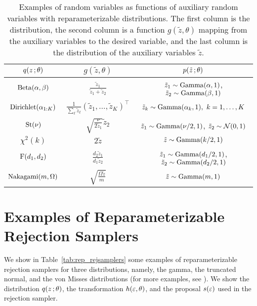 \begin{table*}[t]
\centering
\begin{tabular}{ccc}
\toprule
$q(z\, ;\theta)$ & $g(\tilde z, \theta)$ &  $p(\tilde z\, ;\theta)$\\
\hline
$\operatorname*{Beta}(\alpha,\beta)$ & $\displaystyle\frac{\tilde z_1}{\tilde z_1 + \tilde z_2}$ & $\tilde z_1 \sim \operatorname*{Gamma}(\alpha,1)$, $\tilde z_2  \sim \operatorname*{Gamma}(\beta,1)$\\%
$\operatorname*{Dirichlet}(\alpha_{1:K})$ &$\displaystyle\frac{1}{\sum_\ell \tilde z_\ell} \left(\tilde z_1,\ldots,\tilde z_K\right)^\top$ & $\tilde z_k \sim \operatorname*{Gamma}(\alpha_k,1), ~k=1,\ldots,K$\\
$\operatorname*{St}(\nu)$ & $\displaystyle\sqrt{\frac{\nu}{2 \tilde z_1}} \tilde z_2$ & $\tilde z_1 \sim \operatorname*{Gamma}(\nu/2,1)$, $\tilde z_2 \sim \mathcal{N}(0,1)$\\
$\chi^2(k)$ & $\displaystyle2\tilde z$& $\tilde z \sim \operatorname*{Gamma}(k/2,1)$\\
$\operatorname*{F}(d_1,d_2)$ & $\displaystyle\frac{d_2 \tilde z_1}{d_1 \tilde z_2}$ & $\tilde z_1 \sim \operatorname*{Gamma}(d_1/2,1)$, $\tilde z_2  \sim \operatorname*{Gamma}(d_2/2,1)$\\
$\operatorname*{Nakagami}(m,\Omega)$ & $\displaystyle \sqrt{\frac{\Omega\tilde z}{m}}$ & $\tilde z \sim \operatorname*{Gamma}(m,1)$ \\ \bottomrule
\end{tabular}
\caption{Examples of random variables as functions of auxiliary random variables with reparameterizable distributions. The first column is the distribution, the second column is a function $g(\tilde{z},\theta)$ mapping from the auxiliary variables to the desired variable, and the last column is the distribution of the auxiliary variables $\tilde z$.\label{tab:aux_rejSamplers}}
\end{table*}

\section{Examples of Reparameterizable Rejection Samplers}

We show in Table~\ref{tab:rep_rejsamplers} some examples of reparameterizable rejection samplers for three distributions, namely, the gamma, the truncated normal, and the von Misses distributions (for more examples, see \citet{devroye1986}). We show the distribution $q(z\, ; \theta)$, the transformation $h(\varepsilon,\theta)$, and the proposal $s(\varepsilon)$ used in the rejection sampler.

